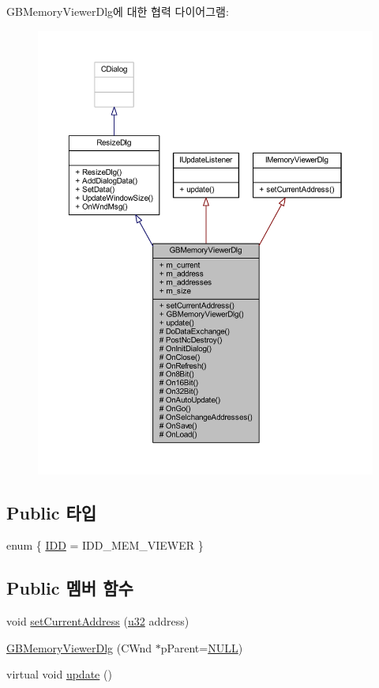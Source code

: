 G\+B\+Memory\+Viewer\+Dlg에 대한 협력 다이어그램\+:\nopagebreak
\begin{figure}[H]
\begin{center}
\leavevmode
\includegraphics[width=350pt]{class_g_b_memory_viewer_dlg__coll__graph}
\end{center}
\end{figure}
\subsection*{Public 타입}
\begin{DoxyCompactItemize}
\item 
enum \{ \mbox{\hyperlink{class_g_b_memory_viewer_dlg_a9817c54337df4c66ab82b7ea720879a2afc6cb593bc0443ee2b8bc010574cb6a5}{I\+DD}} = I\+D\+D\+\_\+\+M\+E\+M\+\_\+\+V\+I\+E\+W\+ER
 \}
\end{DoxyCompactItemize}
\subsection*{Public 멤버 함수}
\begin{DoxyCompactItemize}
\item 
void \mbox{\hyperlink{class_g_b_memory_viewer_dlg_a9d6e6bf119f77c2b8843800ae5a6df7b}{set\+Current\+Address}} (\mbox{\hyperlink{_system_8h_a10e94b422ef0c20dcdec20d31a1f5049}{u32}} address)
\item 
\mbox{\hyperlink{class_g_b_memory_viewer_dlg_ae3507dbe84b33eb4839ba04b706f3bcc}{G\+B\+Memory\+Viewer\+Dlg}} (C\+Wnd $\ast$p\+Parent=\mbox{\hyperlink{_system_8h_a070d2ce7b6bb7e5c05602aa8c308d0c4}{N\+U\+LL}})
\item 
virtual void \mbox{\hyperlink{class_g_b_memory_viewer_dlg_acb02578600a9ecd38ac653306241089b}{update}} ()
\end{DoxyCompactItemize}
